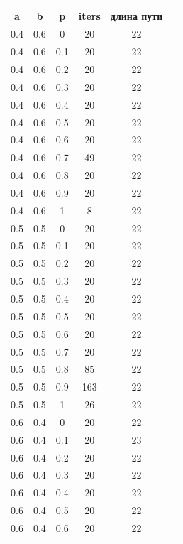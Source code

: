 \documentclass[a4paper,12pt]{article}
\begin{document}
\begin{table}
\begin{minipage}[!h]{0.50\hsize}
\begin{center}
\begin{tabular}{c@{\hspace{7mm}}c@{\hspace{7mm}}c@{\hspace{7mm}}c@{\hspace{7mm}}c@{\hspace{7mm}}c}
    				\toprule
    				a        &b      &p      &iters &длина пути \\
    				\midrule
    				0.4     &0.6    &0      &20    &22\\
    				0.4     &0.6    &0.1    &20    &22\\
    				0.4     &0.6    &0.2    &20    &22\\
    				0.4     &0.6    &0.3    &20    &22\\
    				0.4     &0.6    &0.4    &20    &22\\
    				0.4     &0.6    &0.5    &20    &22\\
    				0.4     &0.6    &0.6    &20    &22\\
    				0.4     &0.6    &0.7    &49    &22\\
    				0.4     &0.6    &0.8    &20    &22\\
    				0.4     &0.6    &0.9    &20    &22\\
    				0.4     &0.6    &1      &8     &22\\
    				\midrule
    				0.5     &0.5    &0      &20    &22\\
    				0.5     &0.5    &0.1    &20    &22\\
    				0.5     &0.5    &0.2    &20    &22\\
    				0.5     &0.5    &0.3    &20    &22\\
    				0.5     &0.5    &0.4    &20    &22\\
    				0.5     &0.5    &0.5    &20    &22\\
    				0.5     &0.5    &0.6    &20    &22\\
    				0.5     &0.5    &0.7    &20    &22\\
    				0.5     &0.5    &0.8    &85    &22\\
    				0.5     &0.5    &0.9    &163   &22\\
    				0.5     &0.5    &1      &26    &22\\
    				\midrule
    				0.6     &0.4    &0      &20    &22\\
    				0.6     &0.4    &0.1    &20    &23\\
    				0.6     &0.4    &0.2    &20    &22\\
    				0.6     &0.4    &0.3    &20    &22\\
    				0.6     &0.4    &0.4    &20    &22\\
    				0.6     &0.4    &0.5    &20    &22\\
    				0.6     &0.4    &0.6    &20    &22\\

\end{tabular}
\end{center}
\end{minipage}
\end{table}
\end{document}
